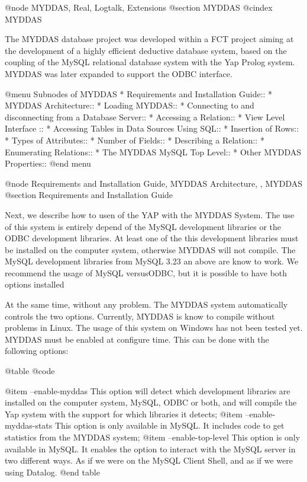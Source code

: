 @node MYDDAS, Real, Logtalk, Extensions
@section MYDDAS
@cindex MYDDAS

The MYDDAS database project was developed within a FCT project aiming at
the development of a highly efficient deductive database system, based
on the coupling of the MySQL relational database system with the Yap
Prolog system. MYDDAS was later expanded to support the ODBC interface.

@menu
Subnodes of MYDDAS
* Requirements and Installation Guide:: 
* MYDDAS Architecture:: 
* Loading MYDDAS:: 
* Connecting to and disconnecting from a Database Server:: 
* Accessing a Relation:: 
* View Level Interface :: 
* Accessing Tables in Data Sources Using SQL:: 
* Insertion of Rows:: 
* Types of Attributes:: 
* Number of Fields:: 
* Describing a Relation:: 
* Enumerating Relations:: 
* The MYDDAS MySQL Top Level:: 
* Other MYDDAS Properties:: 
@end menu

@node Requirements and Installation Guide, MYDDAS Architecture, , MYDDAS
@section Requirements and Installation Guide

Next, we describe how to usen of the YAP with the MYDDAS System.  The
use of this system is entirely depend of the MySQL development libraries
or the ODBC development libraries. At least one of the this development
libraries must be installed on the computer system, otherwise MYDDAS
will not compile. The MySQL development libraries from MySQL 3.23 an
above are know to work. We recommend the usage of MySQL versusODBC,
but it is possible to have both options installed

At the same time, without any problem. The MYDDAS system automatically
controls the two options. Currently, MYDDAS is know to compile without
problems in Linux. The usage of this system on Windows has not been
tested yet.  MYDDAS must be enabled at configure time. This can be done
with the following options: 

@table @code

@item --enable-myddas
 This option will detect which development libraries are installed on the computer system, MySQL, ODBC or both, and will compile the Yap system with the support for which libraries it detects;
@item  --enable-myddas-stats
This option is only available in MySQL. It includes code to get
statistics from the MYDDAS system;
@item  --enable-top-level
This option is only available in MySQL.  It enables the option to interact with the MySQL server in
two different ways. As if we were on the MySQL Client Shell, and as if
we were using Datalog. 
@end table

